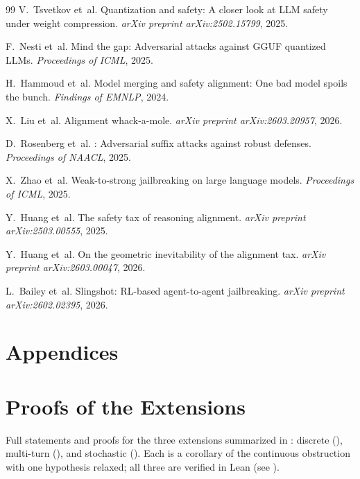 \documentclass[11pt]{article}
\begin{document}
\begin{thebibliography}{99}
V.~Tsvetkov et~al.
\newblock Quantization and safety: A closer look at {LLM} safety
  under weight compression.
\newblock \emph{arXiv preprint arXiv:2502.15799}, 2025.

F.~Nesti et~al.
\newblock Mind the gap: Adversarial attacks against {GGUF} quantized
  {LLMs}.
\newblock \emph{Proceedings of ICML}, 2025.

H.~Hammoud et~al.
\newblock Model merging and safety alignment: One bad model spoils the
  bunch.
\newblock \emph{Findings of EMNLP}, 2024.

X.~Liu et~al.
\newblock Alignment whack-a-mole.
\newblock \emph{arXiv preprint arXiv:2603.20957}, 2026.

D.~Rosenberg et~al.
: Adversarial suffix attacks against robust defenses.
\newblock \emph{Proceedings of NAACL}, 2025.

X.~Zhao et~al.
\newblock Weak-to-strong jailbreaking on large language models.
\newblock \emph{Proceedings of ICML}, 2025.

Y.~Huang et~al.
\newblock The safety tax of reasoning alignment.
\newblock \emph{arXiv preprint arXiv:2503.00555}, 2025.

Y.~Huang et~al.
\newblock On the geometric inevitability of the alignment tax.
\newblock \emph{arXiv preprint arXiv:2603.00047}, 2026.

L.~Bailey et~al.
\newblock Slingshot: {RL}-based agent-to-agent jailbreaking.
\newblock \emph{arXiv preprint arXiv:2602.02395}, 2026.

\end{thebibliography}


\newpage
\appendix
\section*{Appendices}

\section{Proofs of the Extensions}
\label{app:extensions-proofs}

Full statements and proofs for the three extensions summarized in
: discrete (), multi-turn
(), and stochastic (). Each
is a corollary of the continuous obstruction with one hypothesis
relaxed; all three are verified in Lean (see
).
\end{document}
